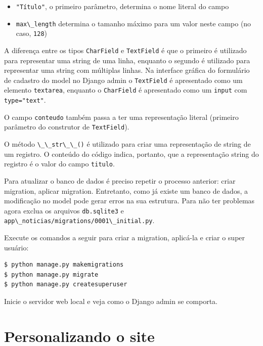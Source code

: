 \documentclass[brazil,a4paper,oneside,openright,parskip=full]{book}
\newcommand{\passthrough}[1]{#1}
\providecommand{\tightlist}{%
  \setlength{\itemsep}{0pt}\setlength{\parskip}{0pt}}
\begin{document}
\begin{itemize}
\tightlist
\item
  \passthrough{\lstinline!"Título"!}, o primeiro parâmetro, determina o
  nome literal do campo
\item
  \passthrough{\lstinline!max\_length!} determina o tamanho máximo para
  um valor neste campo (no caso, \passthrough{\lstinline!128!})
\end{itemize}

A diferença entre os tipos \passthrough{\lstinline!CharField!} e
\passthrough{\lstinline!TextField!} é que o primeiro é utilizado para
representar uma string de uma linha, enquanto o segundo é utilizado para
representar uma string com múltiplas linhas. Na interface gráfica do
formulário de cadastro do model no Django admin o
\passthrough{\lstinline!TextField!} é apresentado como um elemento
\passthrough{\lstinline!textarea!}, enquanto o
\passthrough{\lstinline!CharField!} é apresentado como um
\passthrough{\lstinline!input!} com
\passthrough{\lstinline!type="text"!}.

O campo \passthrough{\lstinline!conteudo!} também passa a ter uma
representação literal (primeiro parâmetro do construtor de
\passthrough{\lstinline!TextField!}).

O método \passthrough{\lstinline!\_\_str\_\_()!} é utilizado para criar
uma representação de string de um registro. O conteúdo do código indica,
portanto, que a representação string do registro é o valor do campo
\passthrough{\lstinline!titulo!}.

Para atualizar o banco de dados é preciso repetir o processo anterior:
criar migration, aplicar migration. Entretanto, como já existe um banco
de dados, a modificação no model pode gerar erros na sua estrutura. Para
não ter problemas agora exclua os arquivos
\passthrough{\lstinline!db.sqlite3!} e
\passthrough{\lstinline!app\_noticias/migrations/0001\_initial.py!}.

Execute os comandos a seguir para criar a migration, aplicá-la e criar o
super usuário:

\begin{lstlisting}[language=sh, style=nonumber]
$ python manage.py makemigrations
$ python manage.py migrate
$ python manage.py createsuperuser
\end{lstlisting}

Inicie o servidor web local e veja como o Django admin se comporta.

\hypertarget{personalizando-o-site}{%
\section{Personalizando o site}\label{personalizando-o-site}}
\end{document}
